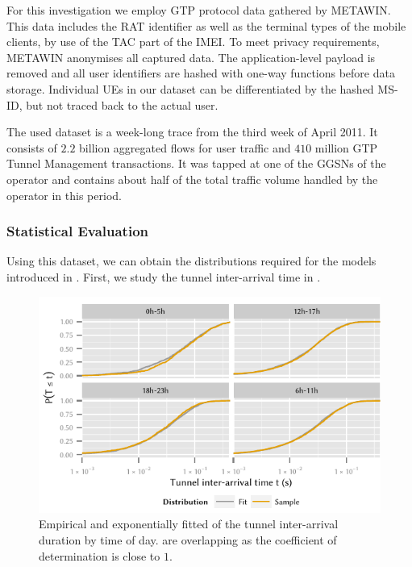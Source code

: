For this investigation we employ \gls{GTP} protocol data gathered by \gls{METAWIN}.
This data includes the \gls{RAT} identifier as well as the terminal types of the mobile clients, by use of the \gls{TAC} part of the \gls{IMEI}.
To meet privacy requirements, \gls{METAWIN} anonymises all captured data.
The application-level payload is removed and all user identifiers are hashed with one-way functions before data storage.
Individual \glspl{UE} in our dataset can be differentiated by the hashed \gls{MS-ID}, but not traced back to the actual user.

The used dataset is a week-long trace from the third week of April 2011.
It consists of \(2.2\) billion aggregated flows for user traffic and \(410\) million \gls{GTP} Tunnel Management transactions.
It was tapped at one of the \glspl{GGSN} of the operator and contains about half of the total traffic volume handled by the operator in this period.

\subsubsection*{Statistical Evaluation}\label{sec:cloud:virtualized_network_functions:measurement_data:evaluation}

Using this dataset, we can obtain the distributions required for the models introduced in .
First, we study the tunnel inter-arrival time in .

\begin{figure}
  \centering
  \includegraphics{cloud/virtualized_network_functions/measurement_data/figures/tunnel_iat}
  \caption{Empirical and exponentially fitted  of the tunnel inter-arrival duration by time of day.  are overlapping as the coefficient of determination is close to \(1\).}
  \label{fig:cloud:virtualized_network_functions:measurement_data:evaluation:tunnel_iat}
\end{figure}

